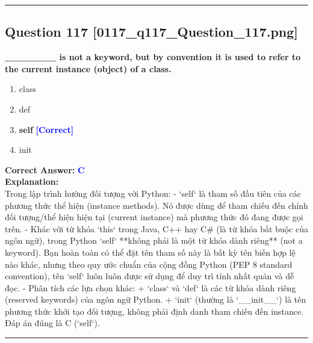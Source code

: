 \documentclass[11pt,a4paper]{article}
\begin{document}
\vspace{0.8cm}
\hrule
\vspace{0.5cm}

\begin{minipage}{\textwidth}
\subsection*{Question 117 \quad \footnotesize{[0117_q117_Question_117.png]}}
\noindent \textbf{_______ is not a keyword, but by convention it is used to refer to the current instance (object) of a class.}

\begin{enumerate}[label=\Alph*.]
    \item class
    \item def
    \item \textbf{self} \hfill \textcolor{blue}{\textbf{[Correct]}}
    \item init
\end{enumerate}

\noindent \textbf{Correct Answer:} \textcolor{blue}{\textbf{C}} \\[4pt]
\noindent \textbf{Explanation:}\\
Trong lập trình hướng đối tượng với Python:\newline
- `self` là tham số đầu tiên của các phương thức thể hiện (instance methods). Nó được dùng để tham chiếu đến chính đối tượng/thể hiện hiện tại (current instance) mà phương thức đó đang được gọi trên.\newline
- Khác với từ khóa `this` trong Java, C++ hay C# (là từ khóa bắt buộc của ngôn ngữ), trong Python `self` **không phải là một từ khóa dành riêng** (not a keyword). Bạn hoàn toàn có thể đặt tên tham số này là bất kỳ tên biến hợp lệ nào khác, nhưng theo quy ước chuẩn của cộng đồng Python (PEP 8 standard convention), tên `self` luôn luôn được sử dụng để duy trì tính nhất quán và dễ đọc.\newline
- Phân tích các lựa chọn khác:\newline
  + `class` và `def` là các từ khóa dành riêng (reserved keywords) của ngôn ngữ Python.\newline
  + `init` (thường là `__init__`) là tên phương thức khởi tạo đối tượng, không phải định danh tham chiếu đến instance.\newline
Đáp án đúng là C (`self`).
\end{minipage}
\vspace{0.8cm}
\hrule
\vspace{0.5cm}
\end{document}
